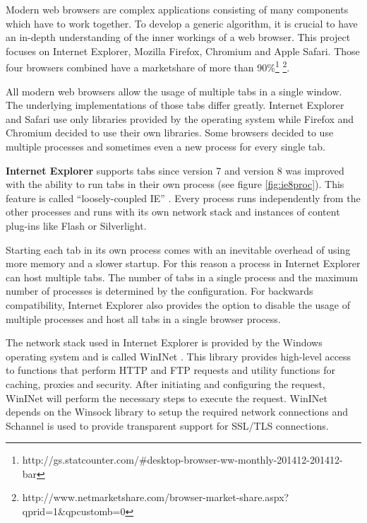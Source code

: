 
Modern web browsers are complex applications consisting of many components which have to work together. To develop a generic algorithm, it is crucial to have an in-depth understanding of the inner workings of a web browser. This project focuses on Internet Explorer, Mozilla Firefox, Chromium and Apple Safari. Those four browsers combined have a marketshare of more than 90\%\footnote{http://gs.statcounter.com/\#desktop-browser-ww-monthly-201412-201412-bar} \footnote{http://www.netmarketshare.com/browser-market-share.aspx?qprid=1\&qpcustomb=0}.

All modern web browsers allow the usage of multiple tabs in a single window. The underlying implementations of those tabs differ greatly. Internet Explorer and Safari use only libraries provided by the operating system while Firefox and Chromium decided to use their own libraries. Some browsers decided to use multiple processes and sometimes even a new process for every single tab.

\textbf{Internet Explorer} supports tabs since version 7 and version 8 was improved with the ability to run tabs in their own process (see figure \ref{fig:ie8proc}). This feature is called ``loosely-coupled IE'' \cite{IE8LCIE}. Every process runs independently from the other processes and runs with its own network stack and instances of content plug-ins like Flash or Silverlight.

Starting each tab in its own process comes with an inevitable overhead of using more memory and a slower startup. For this reason a process in Internet Explorer can host multiple tabs. The number of tabs in a single process and the maximum number of processes is determined by the configuration. For backwards compatibility, Internet Explorer also provides the option to disable the usage of multiple processes and host all tabs in a single browser process.

\label{sec:brie}
The network stack used in Internet Explorer is provided by the Windows operating system and is called WinINet \cite{wininet}. This library provides high-level access to functions that perform HTTP and FTP requests and utility functions for caching, proxies and security. After initiating and configuring the request, WinINet will perform the necessary steps to execute the request. WinINet depends on the Winsock library \cite{winsock} to setup the required network connections and Schannel \cite{schannel} is used to provide transparent support for SSL/TLS connections.


